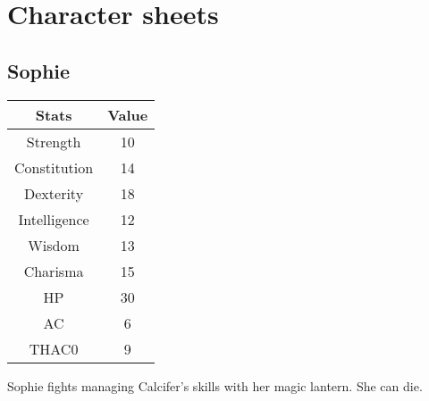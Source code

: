 \section{Character sheets}
\subsection{Sophie}
\begin{table}[H]
\begin{tabular}{|c|c|}
\hline
\rowcolor[HTML]{C0C0C0} 
\textbf{Stats} & \textbf{Value} \\ \hline
Strength & 10 \\ \hline
Constitution & 14 \\ \hline
Dexterity & 18 \\ \hline
Intelligence & 12 \\ \hline
Wisdom & 13 \\ \hline
Charisma & 15 \\ \hline
HP & 30 \\ \hline
AC & 6 \\ \hline
THAC0 & 9 \\ \hline
\end{tabular}
\end{table}
Sophie fights managing Calcifer's skills with her magic lantern. She can die.
